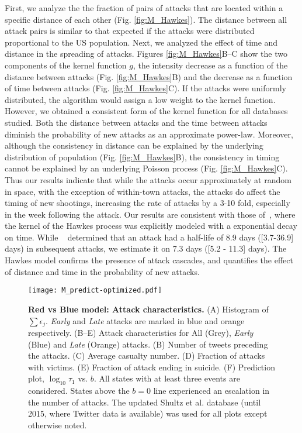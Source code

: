 First, we analyze the the fraction of pairs of attacks that are
located within a specific distance of each other
(Fig. \ref{fig:M_Hawkes}). 
The distance between all attack pairs is similar to that expected if
the attacks were distributed proportional to the US population. 
Next, we analyzed the effect of time and distance in the spreading of
attacks. 
Figures \ref{fig:M_Hawkes}B--C show the two components of the kernel
function $g$, the intensity decrease as a function of the distance
between attacks (Fig. \ref{fig:M_Hawkes}B) and the decrease as a
function of time between attacks (Fig. \ref{fig:M_Hawkes}C). 
If the attacks were uniformly distributed, the algorithm would assign
a low weight to the kernel function.
However, we obtained a consistent form of the kernel function for all
databases studied. 
Both the distance between attacks and the time between attacks
diminish the probability of new attacks as an approximate power-law. 
Moreover, although the consistency in distance can be explained by the
underlying distribution of population (Fig. \ref{fig:M_Hawkes}B), the
consistency in timing cannot be explained by an underlying Poisson
process (Fig. \ref{fig:M_Hawkes}C).
Thus our results indicate that while the attacks occur approximately
at random in space, with the exception of within-town attacks, the
attacks do affect the timing of new shootings, increasing the rate of
attacks by a 3-10 fold, especially in the week following the attack.
Our results are consistent with those of~\citet{towers2015a}, 
where the kernel of the Hawkes process was explicitly modeled with a exponential decay on time.
While ~\citet{towers2015a} determined that an attack had a half-life of 8.9 days ([3.7-36.9] days) in subsequent attacks,
we estimate it on 7.3 days ([5.2 - 11.3] days).
The Hawkes model confirms the presence of attack cascades, and
quantifies the effect of distance and time in the probability of new
attacks.

\begin{figure*}[htp!]
  \centering
  \texttt{[image: M\_predict-optimized.pdf]}
  \caption{
    \textbf{Red vs Blue model: Attack characteristics.} 
    (A) Histogram of $\sum{\epsilon_j}$. \textit{Early} and
    \textit{Late} attacks are marked in blue and orange respectively.         
    (B--E) Attack characteristics for All (Grey), \textit{Early}
    (Blue) and \textit{Late} (Orange) attacks. (B) Number of tweets
    preceding the attacks. (C) Average casualty number. (D) Fraction
    of attacks with victims. (E) Fraction of attack ending in
    suicide. (F) Prediction plot, $\log_{10}{\tau_1}$ vs. $b$. All states with at least three events are considered. States above the $b=0$ line experienced an escalation in the number of attacks. 
The updated Shultz et al. database (until 2015, where Twitter data is available) was used for all plots except otherwise noted.
  }
  \label{fig:M_predict}
\end{figure*}



